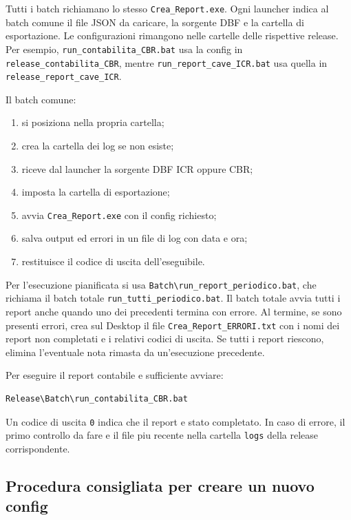 Tutti i batch richiamano lo stesso \texttt{Crea\_Report.exe}. Ogni launcher
indica al batch comune il file JSON da caricare, la sorgente DBF e la cartella
di esportazione. Le configurazioni rimangono nelle cartelle delle rispettive
release. Per esempio, \texttt{run\_contabilita\_CBR.bat} usa la config in
\texttt{release\_contabilita\_CBR}, mentre
\texttt{run\_report\_cave\_ICR.bat} usa quella in
\texttt{release\_report\_cave\_ICR}.

Il batch comune:

\begin{enumerate}
  \item si posiziona nella propria cartella;
  \item crea la cartella dei log se non esiste;
  \item riceve dal launcher la sorgente DBF ICR oppure CBR;
  \item imposta la cartella di esportazione;
  \item avvia \texttt{Crea\_Report.exe} con il config richiesto;
  \item salva output ed errori in un file di log con data e ora;
  \item restituisce il codice di uscita dell'eseguibile.
\end{enumerate}

Per l'esecuzione pianificata si usa
\texttt{Batch\textbackslash run\_report\_periodico.bat}, che richiama il batch
totale \texttt{run\_tutti\_periodico.bat}. Il batch totale avvia tutti i report
anche quando uno dei precedenti termina con errore. Al termine, se sono
presenti errori, crea sul Desktop il file
\texttt{Crea\_Report\_ERRORI.txt} con i nomi dei report non completati e i
relativi codici di uscita. Se tutti i report riescono, elimina l'eventuale nota
rimasta da un'esecuzione precedente.

Per eseguire il report contabile e sufficiente avviare:

\begin{lstlisting}
Release\Batch\run_contabilita_CBR.bat
\end{lstlisting}

Un codice di uscita \texttt{0} indica che il report e stato completato.
In caso di errore, il primo controllo da fare e il file piu recente nella
cartella \texttt{logs} della release corrispondente.

\subsection{Procedura consigliata per creare un nuovo config}

